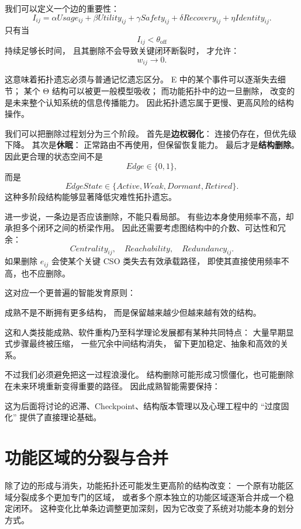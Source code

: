 我们可以定义一个边的重要性：
\[
I_{ij}
=
\alpha
Usage_{ij}
+
\beta
Utility_{ij}
+
\gamma
Safety_{ij}
+
\delta
Recovery_{ij}
+
\eta
Identity_{ij}.
\]
只有当
\[
I_{ij}<\theta_{\mathrm{off}}
\]
持续足够长时间，
且其删除不会导致关键闭环断裂时，
才允许：
\[
w_{ij}\rightarrow 0.
\]

这意味着拓扑遗忘必须与普通记忆遗忘区分。
E 中的某个事件可以逐渐失去细节；
某个 Θ 结构可以被更一般模型吸收；
而功能拓扑中的边一旦删除，
改变的是未来整个认知系统的信息传播能力。
因此拓扑遗忘属于更慢、更高风险的结构操作。

我们可以把删除过程划分为三个阶段。
首先是\textbf{边权弱化}：
连接仍存在，但优先级下降。
其次是\textbf{休眠}：
正常路由不再使用，但保留恢复能力。
最后才是\textbf{结构删除}。
因此更合理的状态空间不是
\[
Edge\in\{0,1\},
\]
而是
\[
EdgeState
\in
\{
Active,
Weak,
Dormant,
Retired
\}.
\]
这种多阶段结构能够显著降低灾难性拓扑遗忘。

进一步说，一条边是否应该删除，不能只看局部。
有些边本身使用频率不高，却承担多个闭环之间的桥梁作用。
因此还需要考虑图结构中的介数、可达性和冗余：
\[
Centrality_{ij},
\quad
Reachability,
\quad
Redundancy_{ij}.
\]
如果删除 $e_{ij}$ 会使某个关键 CSO 类失去有效承载路径，
即使其直接使用频率不高，也不应删除。

这对应一个更普遍的智能发育原则：
\begin{proposition*}
成熟不是不断拥有更多结构，
而是保留越来越少但越来越有效的结构。
\end{proposition*}
这和人类技能成熟、软件重构乃至科学理论发展都有某种共同特点：
大量早期显式步骤最终被压缩，
一些冗余中间结构消失，
留下更加稳定、抽象和高效的关系。

不过我们必须避免把这一过程浪漫化。
结构删除可能形成习惯僵化，也可能删除在未来环境重新变得重要的路径。
因此成熟智能需要保持：
\begin{statementbox}
\centering
{}
\end{statementbox}
这为后面将讨论的迟滞、Checkpoint、结构版本管理以及心理工程中的 ``过度固化'' 提供了直接理论基础。

\section{功能区域的分裂与合并}

除了边的形成与消失，功能拓扑还可能发生更高阶的结构改变：
一个原有功能区域分裂成多个更加专门的区域，
或者多个原本独立的功能区域逐渐合并成一个稳定闭环。
这种变化比单条边调整更加深刻，因为它改变了系统对功能本身的划分方式。

